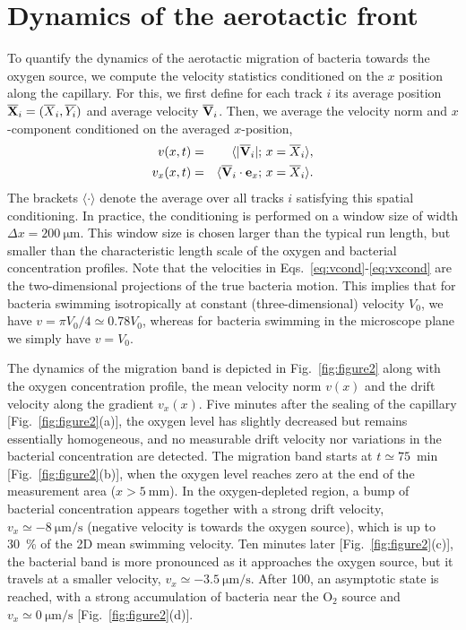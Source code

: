 \documentclass[aps,a4paper,twocolumn,10pt,pre,showpacs]{revtex4-2}
\begin{document}
\section{Dynamics of the aerotactic front}
\label{sec:macro}

To quantify the dynamics of the aerotactic migration of bacteria towards the oxygen source, we compute the velocity statistics conditioned on the $x$ position along the capillary. For this, we first define for each track $i$ its average position $\overline{{\bf X}}_i=(\overline{X}_i,\overline{Y_i})$ and average velocity $\overline{\bf V}_i$. Then, we average the velocity norm and $x$-component conditioned on the averaged $x$-position,
\begin{eqnarray}
    v(x,t) &=& \langle | \overline{\bf V}_i | ; \, x = \overline{X}_i \rangle, \label{eq:vcond} \\
    v_x(x,t) &=& \langle  \overline{\bf V}_i \cdot {\bf e}_x ; \, x = \overline{X}_i \rangle.
\label{eq:vxcond}
\end{eqnarray}
The brackets $\langle \cdot \rangle$ denote the average over all tracks $i$ satisfying this spatial conditioning. In practice, the conditioning is performed on a window size of width $\Delta x = \SI{200}{\um}$. This window size is chosen larger than the typical run length, but smaller than the characteristic length scale of the oxygen and bacterial concentration profiles. Note that the velocities in Eqs.~\eqref{eq:vcond}-\eqref{eq:vxcond} are the two-dimensional projections of the true bacteria motion. This implies that for bacteria swimming isotropically at constant (three-dimensional) velocity $V_0$, we have $v=\pi V_0/4 \simeq 0.78 V_0$, whereas for bacteria swimming in the microscope plane we simply have $v=V_0$.


The dynamics of the migration band is depicted in Fig.~\ref{fig:figure2} along with the oxygen concentration profile, the mean velocity norm $v(x)$ and the drift velocity along the gradient $v_x(x)$. Five minutes after the sealing of the capillary [Fig.~\ref{fig:figure2}(a)], the oxygen level has slightly decreased but remains essentially homogeneous, and no measurable drift velocity nor variations in the bacterial concentration are detected. The migration band starts at $t\simeq \SI{75}{\min}$ [Fig.~\ref{fig:figure2}(b)], when the oxygen level reaches zero at the end of the measurement area ($x>\SI{5}{\mm}$). In the oxygen-depleted region, a bump of bacterial concentration appears together with a strong drift velocity, $v_x \simeq \SI{-8}{\um\per\s}$ (negative velocity is towards the oxygen source), which is up to \SI{30}{\%} of the 2D mean swimming velocity. Ten minutes later [Fig.~\ref{fig:figure2}(c)], the bacterial band is more pronounced as it approaches the oxygen source, but it travels at a smaller velocity, $v_x \simeq \SI{-3.5}{\um\per\s}$. After \SI{100}{\min}, an asymptotic state is reached, with a strong accumulation of bacteria near the $\text{O}_2$ source and $v_x \simeq \SI{0}{\um\per\s}$ [Fig.~\ref{fig:figure2}(d)].
\end{document}
